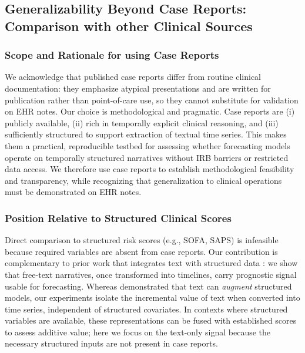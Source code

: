 \subsection{Generalizability Beyond Case Reports: Comparison with other Clinical Sources}
\label{ch07:apd:beyond_pmoa}

\ChSevenHeadingOnly
\subsubsection{Scope and Rationale for using Case Reports}
We acknowledge that published case reports differ from routine clinical documentation: they emphasize atypical presentations and are written for publication rather than point-of-care use, so they cannot substitute for validation on EHR notes.
Our choice is methodological and pragmatic.
Case reports are (i) publicly available, (ii) rich in temporally explicit clinical reasoning, and (iii) sufficiently structured to support extraction of textual time series.
This makes them a practical, reproducible testbed for assessing whether forecasting models operate on temporally structured narratives without IRB barriers or restricted data access.
We therefore use case reports to establish methodological feasibility and transparency, while recognizing that generalization to clinical operations must be demonstrated on EHR notes.

\subsubsection{Position Relative to Structured Clinical Scores}
Direct comparison to structured risk scores (e.g., SOFA, SAPS) is infeasible because required variables are absent from case reports.
Our contribution is complementary to prior work that integrates text with structured data \citep{kline2022multimodal,wang2025large}: we show that free-text narratives, once transformed into timelines, carry prognostic signal usable for forecasting.
Whereas \citet{kline2022multimodal} demonstrated that text can \emph{augment} structured models, our experiments isolate the incremental value of text when converted into time series, independent of structured covariates.
In contexts where structured variables are available, these representations can be fused with established scores to assess additive value; here we focus on the text-only signal because the necessary structured inputs are not present in case reports.

\FloatBarrier
